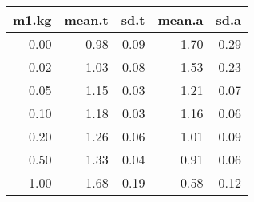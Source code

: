 \begin{table}[ht]
\centering
\begin{tabular}{rrrrr}
  \hline
m1.kg & mean.t & sd.t & mean.a & sd.a \\ 
  \hline
0.00 & 0.98 & 0.09 & 1.70 & 0.29 \\ 
  0.02 & 1.03 & 0.08 & 1.53 & 0.23 \\ 
  0.05 & 1.15 & 0.03 & 1.21 & 0.07 \\ 
  0.10 & 1.18 & 0.03 & 1.16 & 0.06 \\ 
  0.20 & 1.26 & 0.06 & 1.01 & 0.09 \\ 
  0.50 & 1.33 & 0.04 & 0.91 & 0.06 \\ 
  1.00 & 1.68 & 0.19 & 0.58 & 0.12 \\ 
   \hline
\end{tabular}
\end{table}
